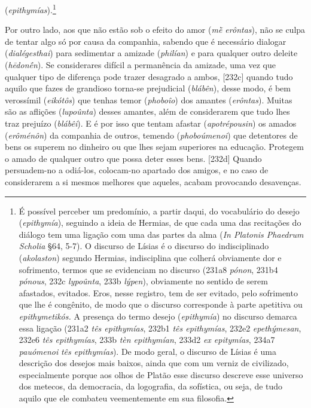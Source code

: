 (\emph{epithymías}).\footnote{É possível perceber um predomínio, a
  partir daqui, do vocabulário do desejo (\emph{epithymía}), seguindo a
  ideia de Hermias, de que cada uma das recitações do diálogo tem uma
  ligação com uma das partes da alma (\emph{In Platonis Phaedrum
  Scholia} §64, 5-7). O discurso de Lísias é o discurso do
  indisciplinado (\emph{akolaston}) segundo Hermias, indisciplina que
  colherá obviamente dor e sofrimento, termos que se evidenciam no
  discurso (231a8 \emph{pónon}, 231b4 \emph{pónous}, 232c
  \emph{lypoûnta}, 233b \emph{lýpen}), obviamente no sentido de serem
  afastados, evitados. Eros, nesse registro, tem de ser evitado, pelo
  sofrimento que lhe é congênito, de modo que o discurso corresponde à
  parte apetitiva ou \emph{epithymetikós.} A presença do termo desejo
  (\emph{epithymía}) no discurso demarca essa ligação (231a2 \emph{tês
  epithymías}, 232b1 \emph{tês epithymías}, 232e2 \emph{epethýmesan},
  232e6 \emph{tês epithymías}, 233b \emph{tèn epithymían}, 233d2
  \emph{ex epitymías}, 234a7 \emph{pauómenoi} \emph{tês epithymías}). De
  modo geral, o discurso de Lísias é uma descrição dos desejos mais
  baixos, ainda que com um verniz de civilizado, especialmente porque
  aos olhos de Platão esse discurso descreve esse universo dos metecos,
  da democracia, da logografia, da sofística, ou seja, de tudo aquilo
  que ele combateu veementemente em sua filosofia.}

Por outro lado, aos que não estão sob o efeito do amor (\emph{mḕ
erôntas}), não se culpa de tentar algo só por causa da companhia,
sabendo que é necessário dialogar (\emph{dialégesthai}) para sedimentar
a amizade (\emph{philían}) e para qualquer outro deleite
(\emph{hēdonḗn}). Se considerares difícil a permanência da amizade, uma
vez que qualquer tipo de diferença pode trazer desagrado a ambos,
{[}232c{]} quando tudo aquilo que fazes de grandioso torna-se
prejudicial (\emph{blábên}), desse modo, é bem verossímil
(\emph{eikótôs}) que tenhas temor (\emph{phoboîo}) dos amantes
(\emph{erôntas}). Muitas são as aflições (\emph{lupoûnta}) desses
amantes, além de considerarem que tudo lhes traz prejuízo
(\emph{blábêi}). E é por isso que tentam afastar (\emph{apotrépousin})
os amados (\emph{erôménôn}) da companhia de outros, temendo
(\emph{phoboúmenoi}) que detentores de bens os superem no dinheiro ou
que lhes sejam superiores na educação. Protegem o amado de qualquer
outro que possa deter esses bens. {[}232d{]} Quando persuadem-no a
odiá-los, colocam-no apartado dos amigos, e no caso de considerarem a si
mesmos melhores que aqueles, acabam provocando desavenças.

